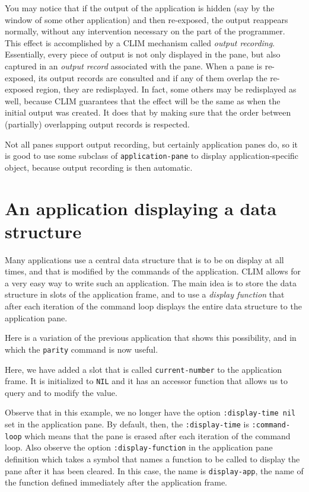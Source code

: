 You may notice that if the output of the application is hidden (say by
the window of some other application) and then re-exposed, the output
reappears normally, without any intervention necessary on the part of
the programmer.  This effect is accomplished by a CLIM mechanism
called \emph{output recording}.  Essentially, every piece of output is
not only displayed in the pane, but also captured in an \emph{output
  record} associated with the pane.  When a pane is re-exposed, its
output records are consulted and if any of them overlap the re-exposed
region, they are redisplayed.  In fact, some others may be redisplayed
as well, because CLIM guarantees that the effect will be the same as
when the initial output was created.  It does that by making sure that
the order between (partially) overlapping output records is respected.

Not all panes support output recording, but certainly application
panes do, so it is good to use some subclass of
\texttt{application-pane} to display application-specific object,
because output recording is then automatic.

\section{An application displaying a data structure}

Many applications use a central data structure that is to be on
display at all times, and that is modified by the commands of the
application.  CLIM allows for a very easy way to write such an
application.  The main idea is to store the data structure in slots of
the application frame, and to use a \emph{display function} that after
each iteration of the command loop displays the entire data structure
to the application pane.

Here is a variation of the previous application that shows this
possibility, and in which the \texttt{parity} command is now useful.



Here, we have added a slot that is called \texttt{current-number} to
the application frame.  It is initialized to \texttt{NIL} and it has
an accessor function that allows us to query and to modify the value.

Observe that in this example, we no longer have the option
\texttt{:display-time nil} set in the application pane.  By default,
then, the \texttt{:display-time} is \texttt{:command-loop} which means
that the pane is erased after each iteration of the command loop.
Also observe the option \texttt{:display-function} in the application
pane definition which takes a symbol that names a function to be
called to display the pane after it has been cleared.  In this case,
the name is \texttt{display-app}, the name of the function defined
immediately after the application frame.


